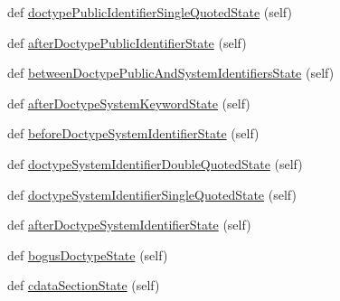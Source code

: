 \begin{DoxyCompactItemize}
def \hyperlink{classpip_1_1__vendor_1_1html5lib_1_1__tokenizer_1_1HTMLTokenizer_aba3a7ce78bbfbd7d3afed507ab6bcd2d}{doctype\+Public\+Identifier\+Single\+Quoted\+State} (self)
\item 
def \hyperlink{classpip_1_1__vendor_1_1html5lib_1_1__tokenizer_1_1HTMLTokenizer_ae5b235e441cf7fef7ebcf77e1243dc44}{after\+Doctype\+Public\+Identifier\+State} (self)
\item 
def \hyperlink{classpip_1_1__vendor_1_1html5lib_1_1__tokenizer_1_1HTMLTokenizer_a502d17571565673fc95038befdf2265d}{between\+Doctype\+Public\+And\+System\+Identifiers\+State} (self)
\item 
def \hyperlink{classpip_1_1__vendor_1_1html5lib_1_1__tokenizer_1_1HTMLTokenizer_a7dd4b1fcb9173bf34affcb6a0e0cfaed}{after\+Doctype\+System\+Keyword\+State} (self)
\item 
def \hyperlink{classpip_1_1__vendor_1_1html5lib_1_1__tokenizer_1_1HTMLTokenizer_ae4e2226e005cc83a7454ad43758a537f}{before\+Doctype\+System\+Identifier\+State} (self)
\item 
def \hyperlink{classpip_1_1__vendor_1_1html5lib_1_1__tokenizer_1_1HTMLTokenizer_a36b6412748873564b80436031ed7c405}{doctype\+System\+Identifier\+Double\+Quoted\+State} (self)
\item 
def \hyperlink{classpip_1_1__vendor_1_1html5lib_1_1__tokenizer_1_1HTMLTokenizer_a91ba7aa006e10d6a914b367d60c60b06}{doctype\+System\+Identifier\+Single\+Quoted\+State} (self)
\item 
def \hyperlink{classpip_1_1__vendor_1_1html5lib_1_1__tokenizer_1_1HTMLTokenizer_a37007d3029e0065e69eb3e1baf5add5c}{after\+Doctype\+System\+Identifier\+State} (self)
\item 
def \hyperlink{classpip_1_1__vendor_1_1html5lib_1_1__tokenizer_1_1HTMLTokenizer_a855bf68db7e67ffd4dcc8be5ec283630}{bogus\+Doctype\+State} (self)
\item 
def \hyperlink{classpip_1_1__vendor_1_1html5lib_1_1__tokenizer_1_1HTMLTokenizer_a7dc11e41a0f2a56964ac7ba6fb215a38}{cdata\+Section\+State} (self)
\end{DoxyCompactItemize}
